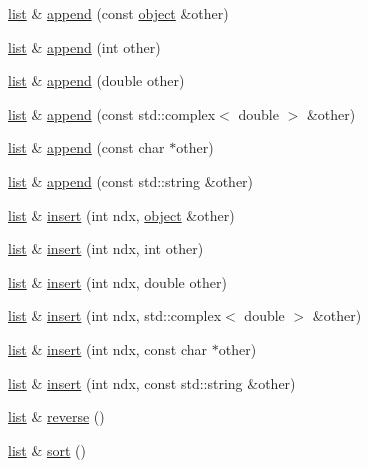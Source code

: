 \begin{DoxyCompactItemize}
\item 
\hyperlink{classpy_1_1list}{list} \& \hyperlink{classpy_1_1list_a4bcbf2613997f298484f3350f79edced}{append} (const \hyperlink{classpy_1_1object}{object} \&other)
\item 
\hyperlink{classpy_1_1list}{list} \& \hyperlink{classpy_1_1list_a40482b115058fb295ef6a7cb0a8821bc}{append} (int other)
\item 
\hyperlink{classpy_1_1list}{list} \& \hyperlink{classpy_1_1list_a1bc2c528a5759d78e828c5f2b0408890}{append} (double other)
\item 
\hyperlink{classpy_1_1list}{list} \& \hyperlink{classpy_1_1list_a24ee9e52f694df11677faf3ea99e529a}{append} (const std\+::complex$<$ double $>$ \&other)
\item 
\hyperlink{classpy_1_1list}{list} \& \hyperlink{classpy_1_1list_a3e0a5a32aebbd28d10068ebe3f5145fe}{append} (const char $\ast$other)
\item 
\hyperlink{classpy_1_1list}{list} \& \hyperlink{classpy_1_1list_aa34a1e6af9fb7d56625ff8db2cf7667c}{append} (const std\+::string \&other)
\item 
\hyperlink{classpy_1_1list}{list} \& \hyperlink{classpy_1_1list_a7fa5177a6d093f848f999f8872dbf5e1}{insert} (int ndx, \hyperlink{classpy_1_1object}{object} \&other)
\item 
\hyperlink{classpy_1_1list}{list} \& \hyperlink{classpy_1_1list_ad2a3e2f8f5c3ef47081a902015816417}{insert} (int ndx, int other)
\item 
\hyperlink{classpy_1_1list}{list} \& \hyperlink{classpy_1_1list_a7c3fcbe32e82f618be74d1c7cb39c449}{insert} (int ndx, double other)
\item 
\hyperlink{classpy_1_1list}{list} \& \hyperlink{classpy_1_1list_a11bfa46eaed0759a2e7779c7c621975b}{insert} (int ndx, std\+::complex$<$ double $>$ \&other)
\item 
\hyperlink{classpy_1_1list}{list} \& \hyperlink{classpy_1_1list_a0ad1f7610d316e7784da7e07805b1b2a}{insert} (int ndx, const char $\ast$other)
\item 
\hyperlink{classpy_1_1list}{list} \& \hyperlink{classpy_1_1list_ae214e6f314aad9f04ab8cd9453031fed}{insert} (int ndx, const std\+::string \&other)
\item 
\hyperlink{classpy_1_1list}{list} \& \hyperlink{classpy_1_1list_a75a91347140538c8498aa17d327cbb4e}{reverse} ()
\item 
\hyperlink{classpy_1_1list}{list} \& \hyperlink{classpy_1_1list_a48133b0020fce4f02b42c8d11a816748}{sort} ()
\end{DoxyCompactItemize}
